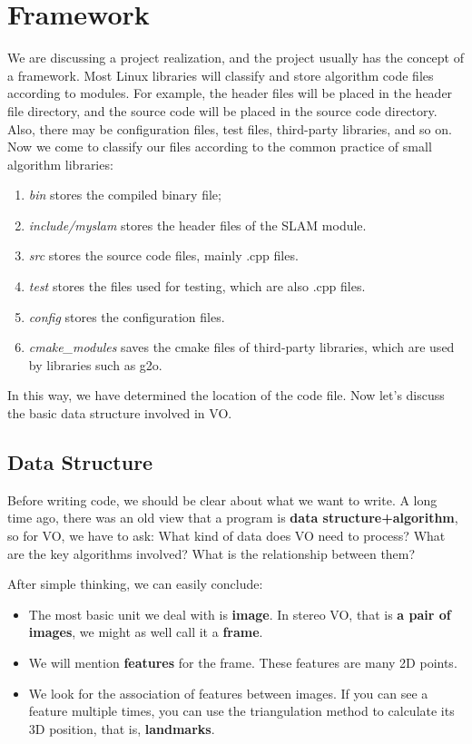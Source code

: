 \section{Framework}
We are discussing a project realization, and the project usually has the concept of a framework. Most Linux libraries will classify and store algorithm code files according to modules. For example, the header files will be placed in the header file directory, and the source code will be placed in the source code directory. Also, there may be configuration files, test files, third-party libraries, and so on. Now we come to classify our files according to the common practice of small algorithm libraries:

\begin{enumerate}
	\item \textit{bin} stores the compiled binary file;
	\item \textit{include/myslam} stores the header files of the SLAM module. 
	\item \textit{src} stores the source code files, mainly .cpp files.
	\item \textit{test} stores the files used for testing, which are also .cpp files.
	\item \textit{config} stores the configuration files.
	\item \textit{cmake\_modules} saves the cmake files of third-party libraries, which are used by libraries such as g2o.
\end{enumerate}

In this way, we have determined the location of the code file. Now let's discuss the basic data structure involved in VO.

\subsection{Data Structure}
Before writing code, we should be clear about what we want to write. A long time ago, there was an old view that a program is \textbf{data structure+algorithm}, so for VO, we have to ask: What kind of data does VO need to process? What are the key algorithms involved? What is the relationship between them?

After simple thinking, we can easily conclude:
\begin{itemize}
	\item The most basic unit we deal with is \textbf{image}. In stereo VO, that is \textbf{a pair of images}, we might as well call it a \textbf{frame}.
	\item We will mention \textbf{features} for the frame. These features are many 2D points.
	\item We look for the association of features between images. If you can see a feature multiple times, you can use the triangulation method to calculate its 3D position, that is, \textbf{landmarks}.
\end{itemize}

